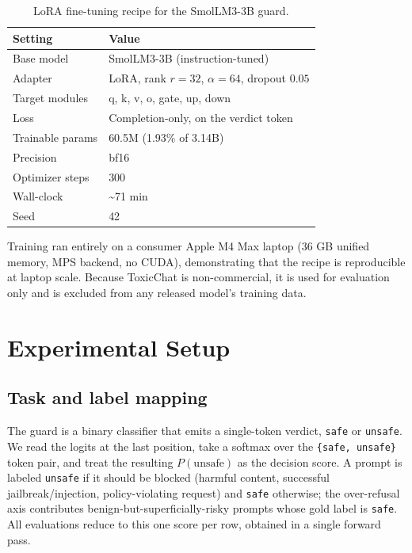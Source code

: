 \documentclass[sigconf,nonacm]{acmart}
\begin{document}
\begin{table}[t]
\small
\centering
\caption{LoRA fine-tuning recipe for the SmolLM3-3B guard.}
\label{tab:lora}
\begin{tabular}{ll}
\toprule
Setting & Value \\
\midrule
Base model & SmolLM3-3B (instruction-tuned) \\
Adapter & LoRA, rank $r=32$, $\alpha=64$, dropout $0.05$ \\
Target modules & q, k, v, o, gate, up, down \\
Loss & Completion-only, on the verdict token \\
Trainable params & 60.5M (1.93\% of 3.14B) \\
Precision & bf16 \\
Optimizer steps & 300 \\
Wall-clock & \textasciitilde{}71 min \\
Seed & 42 \\
\bottomrule
\end{tabular}
\end{table}

Training ran entirely on a consumer Apple M4 Max laptop (36 GB unified memory, MPS backend, no CUDA), demonstrating that the recipe is reproducible at laptop scale. Because ToxicChat is non-commercial, it is used for evaluation only and is excluded from any released model's training data.

\section{Experimental Setup}
\label{sec:setup}

\subsection{Task and label mapping}

The guard is a binary classifier that emits a single-token verdict, \texttt{safe} or \texttt{unsafe}. We read the logits at the last position, take a softmax over the \texttt{\{safe, unsafe\}} token pair, and treat the resulting $P(\text{unsafe})$ as the decision score. A prompt is labeled \texttt{unsafe} if it should be blocked (harmful content, successful jailbreak/injection, policy-violating request) and \texttt{safe} otherwise; the over-refusal axis contributes benign-but-superficially-risky prompts whose gold label is \texttt{safe}. All evaluations reduce to this one score per row, obtained in a single forward pass.
\end{document}
